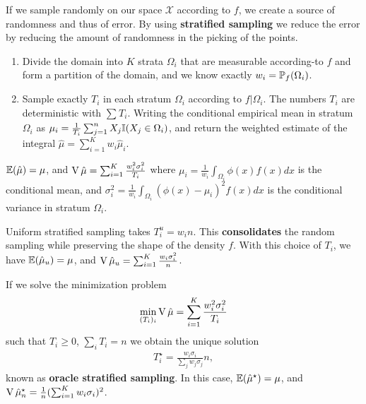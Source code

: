 \begin{defn}
  \label{sec:monte-carlo-method-6}
  If we sample randomly on our space $\mathcal{X}$ according to $f$,
  we create a source of randomness and thus of error.  By using
  \textbf{stratified sampling} we reduce the error by reducing the
  amount of randomness in the picking of the points.

  \begin{enumerate}
  \item Divide the domain into $K$ strata $\Omega_{i}$ that are
    measurable according-to $f$ and form a partition of the domain, and
    we know exactly $w_{i} = \Prob_{f}(\Omega_{i})$.
  \item Sample exactly $T_{i}$ in each stratum $\Omega_{i}$ according
    to $f | \Omega_{i}$.  The numbers $T_{i}$ are deterministic with
    $\sum_{}^{} T_{i}$.  Writing the conditional empirical mean in
    stratum $\Omega_{i}$ as $\mu_{i} = \frac{1}{T_{i}} \sum_{j=1}^{n}
    X_{j} \I{X_{j} \in \Omega_{i}}$, and return the weighted estimate
    of the integral $\hat \mu = \sum_{i=1}^{K} w_{i} \hat \mu_{i}$.
  \end{enumerate}
\end{defn}

\begin{thm}
  \label{sec:monte-carlo-method-7}
  $\E{\hat \mu} = \mu$, and $\operatorname*{V} \hat \mu = \sum_{i=1}^{K}
  \frac{w_{i}^{2} \sigma^{2}_{i}}{T_{i}} $ where $\mu_{i} =
  \frac{1}{w_{i}} \int_{\Omega_{i}} \phi(x) f(x) dx$ is the
  conditional mean, and $\sigma^{2}_{i} = \frac{1}{w_{i}}
  \int_{\Omega_{i}}^{} (\phi(x) - \mu_{i})^{2} f(x) dx $ is the
  conditional variance in stratum $\Omega_{i}$.
\end{thm}

\begin{defn}
  \label{sec:monte-carlo-method-8}
  Uniform stratified sampling takes $T_{i}^{u} = w_{i} n$.  This
  \textbf{consolidates} the random sampling while preserving the shape
  of the density $f$.  With this choice of $T_{i}$, we have $\E{\hat
    \mu_{u}} = \mu$, and $\operatorname*{V} \hat \mu_{u} = \sum_{i=1}^{K} \frac{w_{i}
  \sigma_{i}^{2}}{n}$.
\end{defn}

\begin{thm}
  \label{sec:monte-carlo-method-9}
  If we solve the minimization problem
  \begin{align}
    \label{eq:5}
    \min_{(T_{i})_{i}} \operatorname*{V} \hat \mu = \sum_{i=1}^{K} \frac{w_{i}^{2}
      \sigma_{i}^{2}}{T_{i}}
  \end{align} such that $T_{i} \geq 0$, $\sum_{i}^{} T_{i} = n$
  we obtain the unique solution
  \begin{align}
    \label{eq:6}
    T_{i}^{\star} = \frac{w_{i} \sigma_{i}}{\sum_{j}^{} w_{j}
      \sigma_{j}} n, 
  \end{align} known as \textbf{oracle stratified sampling}.  In this
  case, $\E{\hat \mu^{\star}} = \mu$, and $\operatorname*{V} \hat \mu^{\star}_{n} =
  \frac{1}{n} (\sum_{i=1}^{K} w_{i} \sigma_{i})^{2}$.
\end{thm}

